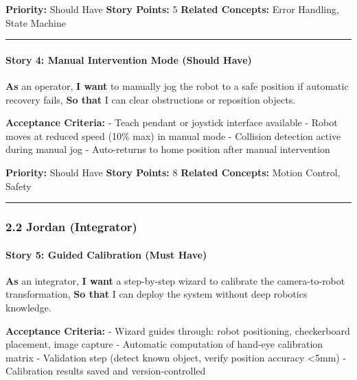 \documentclass[
]{article}
\begin{document}
\textbf{Priority:} Should Have \textbf{Story Points:} 5 \textbf{Related
Concepts:} Error Handling, State Machine

\begin{center}\rule{0.5\linewidth}{0.5pt}\end{center}

\hypertarget{story-4-manual-intervention-mode-should-have}{%
\paragraph{Story 4: Manual Intervention Mode (Should
Have)}\label{story-4-manual-intervention-mode-should-have}}

\textbf{As} an operator, \textbf{I want} to manually jog the robot to a
safe position if automatic recovery fails, \textbf{So that} I can clear
obstructions or reposition objects.

\textbf{Acceptance Criteria:} - Teach pendant or joystick interface
available - Robot moves at reduced speed (10\% max) in manual mode -
Collision detection active during manual jog - Auto-returns to home
position after manual intervention

\textbf{Priority:} Should Have \textbf{Story Points:} 8 \textbf{Related
Concepts:} Motion Control, Safety

\begin{center}\rule{0.5\linewidth}{0.5pt}\end{center}

\hypertarget{jordan-integrator}{%
\subsubsection{2.2 Jordan (Integrator)}\label{jordan-integrator}}

\hypertarget{story-5-guided-calibration-must-have}{%
\paragraph{Story 5: Guided Calibration (Must
Have)}\label{story-5-guided-calibration-must-have}}

\textbf{As} an integrator, \textbf{I want} a step-by-step wizard to
calibrate the camera-to-robot transformation, \textbf{So that} I can
deploy the system without deep robotics knowledge.

\textbf{Acceptance Criteria:} - Wizard guides through: robot
positioning, checkerboard placement, image capture - Automatic
computation of hand-eye calibration matrix - Validation step (detect
known object, verify position accuracy \textless5mm) - Calibration
results saved and version-controlled
\end{document}
